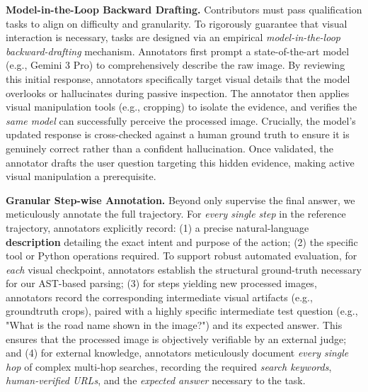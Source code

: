 \documentclass[runningheads]{llncs}
\theoremstyle{plain}
\theoremstyle{definition}
\theoremstyle{remark}
\begin{document}
\noindent\textbf{Model-in-the-Loop Backward Drafting.}
Contributors must pass qualification tasks to align on difficulty and granularity. To rigorously guarantee that visual interaction is necessary, tasks are designed via an empirical \textit{model-in-the-loop backward-drafting} mechanism. Annotators first prompt a state-of-the-art model (e.g., Gemini 3 Pro) to comprehensively describe the raw image. By reviewing this initial response, annotators specifically target visual details that the model overlooks or hallucinates during passive inspection. The annotator then applies visual manipulation tools (e.g., cropping) to isolate the evidence, and verifies the \emph{same model} can successfully perceive the processed image. Crucially, the model's updated response is cross-checked against a human ground truth to ensure it is genuinely correct rather than a confident hallucination. Once validated, the annotator drafts the user question targeting this hidden evidence, making active visual manipulation a prerequisite.

\vspace{1mm}
\noindent\textbf{Granular Step-wise Annotation.}
Beyond only supervise the final answer, we meticulously annotate the full trajectory. For \emph{every single step} in the reference trajectory, annotators explicitly record: 
(1) a precise natural-language \textbf{description} detailing the exact intent and purpose of the action; 
(2) the specific tool or Python operations required. To support robust automated evaluation, for \emph{each} visual checkpoint, annotators establish the structural ground-truth necessary for our AST-based parsing; (3) for steps yielding new processed images, annotators record the corresponding intermediate visual artifacts (e.g., groundtruth crops), paired with a highly specific intermediate test question (e.g., "What is the road name shown in the image?") and its expected answer. This ensures that the processed image is objectively verifiable by an external judge; and 
(4) for external knowledge, annotators meticulously document \emph{every single hop} of complex multi-hop searches, recording the required \textit{search keywords}, \textit{human-verified URLs}, and the \textit{expected answer} necessary to the task.
\end{document}
